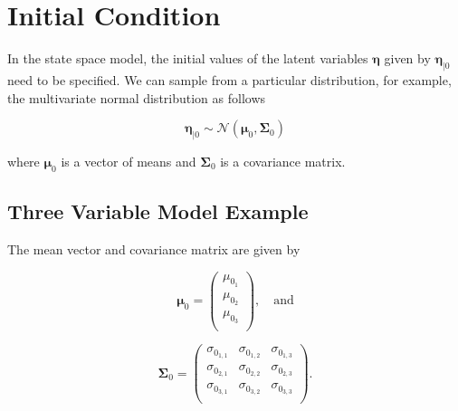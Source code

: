 \documentclass{article}
\begin{document}
\section{Initial Condition}

In the state space model, the initial values of the latent variables $\boldsymbol{\eta}$ given by $\boldsymbol{\eta}_{\mid 0}$ need to be specified. We can sample from a particular distribution, for example, the multivariate normal distribution as follows

\begin{equation}
    \boldsymbol{\eta}_{\mid 0} \sim \mathcal{N} \left( \boldsymbol{\mu}_{0}, \boldsymbol{\Sigma}_{0} \right)
\end{equation}

\noindent where $\boldsymbol{\mu}_{0}$ is a vector of means and $\boldsymbol{\Sigma}_{0}$ is a covariance matrix.

\subsection{Three Variable Model Example}

The mean vector and covariance matrix are given by

\begin{equation}
    \boldsymbol{\mu}_{0}
    =
    \left(
    \begin{array}{c}
        \mu_{0_{1}} \\
        \mu_{0_{2}} \\
        \mu_{0_{3}} \\
    \end{array}
    \right) ,
    \quad
    \text{and}
\end{equation}

\begin{equation}
    \boldsymbol{\Sigma}_{0}
    =
    \left(
    \begin{array}{ccc}
        \sigma_{0_{1, 1}} & \sigma_{0_{1, 2}} & \sigma_{0_{1, 3}} \\
        \sigma_{0_{2, 1}} & \sigma_{0_{2, 2}} & \sigma_{0_{2, 3}} \\
        \sigma_{0_{3, 1}} & \sigma_{0_{3, 2}} & \sigma_{0_{3, 3}} \\
    \end{array}
    \right) .
\end{equation}
\end{document}

